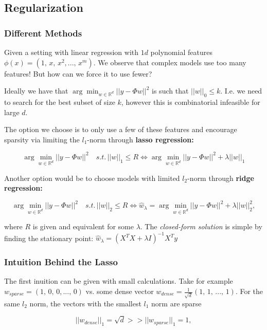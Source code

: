 \documentclass[a4paper]{extarticle}
\begin{document}
\subsection{Regularization}

\subsubsection{Different Methods}

Given a setting with linear regression with \(1d\) polynomial features \(\phi(x) = (1, \, x, \, x^2,..., \, x^m)\). We observe that complex models use too many features! But how can we force it to use fewer?

Ideally we have that \(\arg \min_{w \in \mathbb{R}^d} ||y - \Phi w||^2\) is such that \(||w||_0 \leq k\). I.e. we need to search for the best subset of size \(k\), however this is combinatorial infeasible for large \(d\).

The option we choose is to only use a few of these features and encourage sparsity via limiting the \(l_1\)-norm through \textbf{lasso regression:}

\[
    \arg \min_{w \in \mathbb{R}^d} ||y - \Phi w||^2 \quad s.t. \, ||w||_1 \leq R \Leftrightarrow \arg \min_{w \in \mathbb{R}^d} ||y - \Phi w||^2 + \lambda ||w||_1
\]

Another option would be to choose models with limited \(l_2\)-norm through \textbf{ridge regression:}

\[
    \arg \min_{w \in \mathbb{R}^d} ||y - \Phi w||^2 \quad s.t. \, ||w||_2 \leq R \Leftrightarrow \hat{w}_{\lambda} = \arg \min_{w \in \mathbb{R}^d} ||y - \Phi w||^2 + \lambda ||w||_2^2,
\]

where \(R\) is given and equivalent for some \(\lambda\). The \textit{closed-form solution} is simple by finding the stationary point: \(\hat{w}_{\lambda} = (X^TX + \lambda I)^{-1}X^Ty\)

\subsubsection{Intuition Behind the Lasso}

The first inuition can be given with small calculations. Take for example \(w_{sparse} = (1, \, 0, \, 0,..., \, 0)\) vs. some dense vector \(w_{dense} = \frac{1}{\sqrt{d}}(1, \, 1, \,..., \, 1)\). For the same \(l_2\) norm, the vectors with the smallest \(l_1\) norm are sparse

\[
    ||w_{dense}||_1 = \sqrt{d} >> ||w_{sparse}||_1 = 1,
\]
\end{document}
